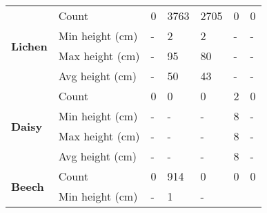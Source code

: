 \begin{table}[]
\begin{tabular}{|p{2cm}|p{2cm}|p{1.5cm}|p{1.5cm}|p{1.5cm}|p{1.5cm}|p{1.5cm}|}
		\multirow{4}{*}{\textbf{Lichen}} & 
						\multicolumn{1}{l|}{Count} & 
						\multicolumn{1}{l|}{0} & 
						\multicolumn{1}{l|}{3763} &
						\multicolumn{1}{l|}{2705} &
						\multicolumn{1}{l|}{0} & 
						\multicolumn{1}{l|}{0} \\\cline{2-7} &
						\multicolumn{1}{l|}{Min height (cm)} & 
						\multicolumn{1}{l|}{-} &
						\multicolumn{1}{l|}{2} & 
						\multicolumn{1}{l|}{2} &
						\multicolumn{1}{l|}{-} & 
						\multicolumn{1}{l|}{-} \\\cline{2-7} &
						\multicolumn{1}{l|}{Max height (cm)} & 
						\multicolumn{1}{l|}{-} & 
						\multicolumn{1}{l|}{95} &
						\multicolumn{1}{l|}{80} &
						\multicolumn{1}{l|}{-} & 
						\multicolumn{1}{l|}{-} \\\cline{2-7} &
						\multicolumn{1}{l|}{Avg height (cm)} & 
						\multicolumn{1}{l|}{-} & 
						\multicolumn{1}{l|}{50} &
						\multicolumn{1}{l|}{43} &
						\multicolumn{1}{l|}{-} & 
						\multicolumn{1}{l|}{-} \\\cline{2-7}
		\hline      
		\multirow{4}{*}{\textbf{Daisy}} & 
						\multicolumn{1}{l|}{Count} & 
						\multicolumn{1}{l|}{0} & 
						\multicolumn{1}{l|}{0} &
						\multicolumn{1}{l|}{0} &
						\multicolumn{1}{l|}{2} & 
						\multicolumn{1}{l|}{0} \\\cline{2-7} &
						\multicolumn{1}{l|}{Min height (cm)} & 
						\multicolumn{1}{l|}{-} &
						\multicolumn{1}{l|}{-} & 
						\multicolumn{1}{l|}{-} &
						\multicolumn{1}{l|}{8} & 
						\multicolumn{1}{l|}{-} \\\cline{2-7} &
						\multicolumn{1}{l|}{Max height (cm)} & 
						\multicolumn{1}{l|}{-} &
						\multicolumn{1}{l|}{-} & 
						\multicolumn{1}{l|}{-} &
						\multicolumn{1}{l|}{8} & 
						\multicolumn{1}{l|}{-} \\\cline{2-7} &
						\multicolumn{1}{l|}{Avg height (cm)} & 
						\multicolumn{1}{l|}{-} &
						\multicolumn{1}{l|}{-} & 
						\multicolumn{1}{l|}{-} &
						\multicolumn{1}{l|}{8} & 
						\multicolumn{1}{l|}{-} \\\cline{2-7}
		\hline     
		\multirow{4}{*}{\textbf{Beech}} & 
						\multicolumn{1}{l|}{Count} & 
						\multicolumn{1}{l|}{0} & 
						\multicolumn{1}{l|}{914} &
						\multicolumn{1}{l|}{0} &
						\multicolumn{1}{l|}{0} & 
						\multicolumn{1}{l|}{0} \\\cline{2-7} &
						\multicolumn{1}{l|}{Min height (cm)} & 
						\multicolumn{1}{l|}{-} &
						\multicolumn{1}{l|}{1} & 
						\multicolumn{1}{l|}{-} &

\end{tabular}
\end{table}
